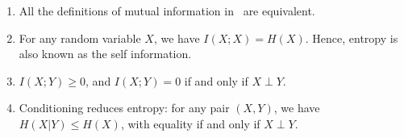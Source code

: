         \begin{proposition}
            \label{prop:mi-basic-properties}
            \begin{enumerate}[label=(\alph*)]
                \item All the definitions of mutual information in~ are equivalent. 
                \item For any random variable $X$, we have $I(X; X) = H(X)$. Hence, entropy is also known as the self information. 
                \item $I(X; Y) \geq 0$, and   $I(X;Y) = 0$ if and only if $X \perp Y$. 
                \item Conditioning reduces entropy: for any pair $(X, Y)$, we have $H(X|Y) \leq H(X)$, with equality if and only if $X \perp Y$.  
            \end{enumerate}
        \end{proposition}

